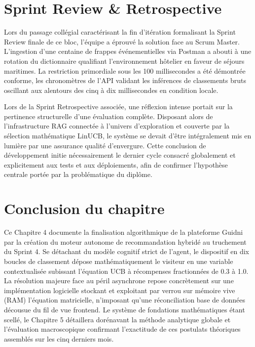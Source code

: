 \section{Sprint Review \& Retrospective}

Lors du passage collégial caractérisant la fin d'itération formalisant la Sprint Review finale de ce bloc, l'équipe a éprouvé la solution face au Scrum Master. L'ingestion d'une centaine de frappes événementielles via Postman a abouti à une rotation du dictionnaire qualifiant l'environnement hôtelier en faveur de séjours maritimes. La restriction primordiale sous les 100 millisecondes a été démontrée conforme, les chronomètres de l'API validant les inférences de classements bruts oscillant aux alentours des cinq à dix millisecondes en condition locale.

Lors de la Sprint Retrospective associée, une réflexion intense portait sur la pertinence structurelle d'une évaluation complète. Disposant alors de l'infrastructure RAG connectée à l'univers d'exploration et couverte par la sélection mathématique LinUCB, le système se devait d'être intégralement mis en lumière par une assurance qualité d'envergure. Cette conclusion de développement initie nécessairement le dernier cycle consacré globalement et explicitement aux tests et aux déploiements, afin de confirmer l'hypothèse centrale portée par la problématique du diplôme.

\section*{Conclusion du chapitre}

Ce Chapitre 4 documente la finalisation algorithmique de la plateforme Guidni par la création du moteur autonome de recommandation hybridé au truchement du Sprint 4. Se détachant du modèle cognitif strict de l'agent, le dispositif en dix boucles de classement dépose mathématiquement le visiteur en une variable contextualisée subissant l'équation UCB à récompenses fractionnées de 0.3 à 1.0. La résolution majeure face au péril asynchrone repose concrètement sur une implémentation logicielle stockant et exploitant par verrou sur mémoire vive (RAM) l'équation matricielle, n'imposant qu'une réconciliation base de données décousue du fil de vue frontend. Le système de fondations mathématiques étant scellé, le Chapitre 5 détaillera dorénavant la méthode analytique globale et l'évaluation macroscopique confirmant l'exactitude de ces postulats théoriques assemblés sur les cinq derniers mois.